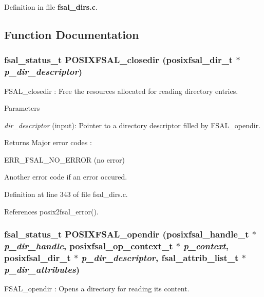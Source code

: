 Definition in file {\bf fsal\_\-dirs.c}.

\subsection{Function Documentation}
\subsubsection[{POSIXFSAL\_\-closedir}]{\setlength{\rightskip}{0pt plus 5cm}fsal\_\-status\_\-t POSIXFSAL\_\-closedir (posixfsal\_\-dir\_\-t $\ast$ {\em p\_\-dir\_\-descriptor})}\label{fsal__dirs_8c_a99a2e0802ca2e796d14c4cf2d2d2558d}
FSAL\_\-closedir : Free the resources allocated for reading directory entries.


\begin{DoxyParams}{Parameters}
\item[{\em dir\_\-descriptor}](input): Pointer to a directory descriptor filled by FSAL\_\-opendir.\end{DoxyParams}
\begin{DoxyReturn}{Returns}
Major error codes :
\begin{DoxyItemize}
\item ERR\_\-FSAL\_\-NO\_\-ERROR (no error)
\item Another error code if an error occured. 
\end{DoxyItemize}
\end{DoxyReturn}


Definition at line 343 of file fsal\_\-dirs.c.

References posix2fsal\_\-error().
\subsubsection[{POSIXFSAL\_\-opendir}]{\setlength{\rightskip}{0pt plus 5cm}fsal\_\-status\_\-t POSIXFSAL\_\-opendir (posixfsal\_\-handle\_\-t $\ast$ {\em p\_\-dir\_\-handle}, \/  posixfsal\_\-op\_\-context\_\-t $\ast$ {\em p\_\-context}, \/  posixfsal\_\-dir\_\-t $\ast$ {\em p\_\-dir\_\-descriptor}, \/  fsal\_\-attrib\_\-list\_\-t $\ast$ {\em p\_\-dir\_\-attributes})}\label{fsal__dirs_8c_a5f229baa77f95d6ddd0a4b4852c2ad5e}
FSAL\_\-opendir : Opens a directory for reading its content.


